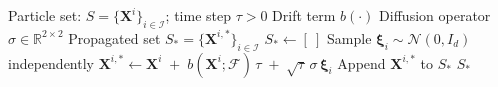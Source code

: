 \documentclass[preprint,12pt]{elsarticle}
\theoremstyle{definition}
\theoremstyle{remark}
\begin{document}
\begin{algorithm}
\caption{SDE propagation of the advection--diffusion step}\label{alg:sde}
\begin{algorithmic}
\Require Particle set: $S=\{\mathbf{X}^i\}_{i\in\mathcal I}$; time step $\tau>0$
\Require Drift term $b(\cdot)$
\Require Diffusion operator $\sigma\in\mathbb R^{2 \times 2}$
\Ensure Propagated set $S_*=\{\mathbf{X}^{i,*}\}_{i\in\mathcal I}$
  \State $S_{*}\gets [\ ]$
    \State Sample $\boldsymbol{\xi}_i \sim \mathcal N(0,I_d)$ independently
    \State $\mathbf{X}^{i,*} \gets \mathbf{X}^i \;+\; b(\mathbf{X}^i;\mathcal F)\,\tau \;+\; \sqrt{\tau}\,\sigma\,\boldsymbol{\xi}_i$
    \State Append $\mathbf{X}^{i,*}$ to $S_{*}$
  \EndFor
  \State \Return $S_{*}$
\EndProcedure
\end{algorithmic}
\end{algorithm}
\end{document}
